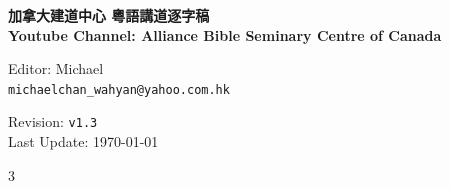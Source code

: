 \documentclass{book}
\author{
  Editor, Michael Chan\\
  \texttt{michaelchan\_wahyan@yahoo.com.hk}
}
\begin{document}
\clearpage
\newcommand\nbvspace[1][3]{\vspace*{\stretch{#1}}}
\newcommand\nbstretchyspace{\spaceskip0.5em plus 0.25em minus 0.25em}
\newcommand{\nbtitlestretch}{\spaceskip0.6em}
\pagestyle{empty}
\begin{center}
\bfseries
\nbvspace[1]
\Huge
{%
\Large
\textbf{加拿大建道中心 粵語講道逐字稿 \\
       Youtube Channel: Alliance Bible Seminary Centre of Canada
       }}

\nbvspace[1]

{\large
Editor: Michael\\
\texttt{michaelchan\_wahyan@yahoo.com.hk}
}

\nbvspace[1]

{\large
Revision: \texttt{v1.3}\\
Last Update: \today
}


\vfill
\begin{tikzpicture}
\end{tikzpicture}
\vfill

\end{center}

\newpage

\setcounter{tocdepth}{0}
\dominitoc
\begin{multicols}{3}
\tableofcontents
\end{multicols}

\large

\end{document}
